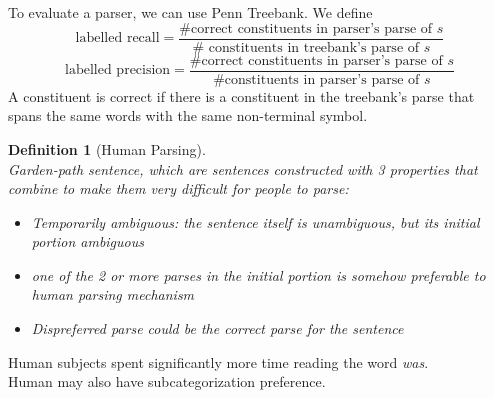 \documentclass[12pt]{article}
\newtheorem{definition}{Definition}[section]
\theoremstyle{definition}
\begin{document}
To evaluate a parser, we can use Penn Treebank. We define
\[
\text{labelled recall} = \frac{\# \text{correct constituents in parser's parse of }s}{\#\text{ constituents in treebank's parse of }s}
\]
\[
\text{labelled precision} = \frac{\#\text{correct constituents in parser's parse of }s}{\#\text{constituents in parser's parse of }s}
\]
A constituent is correct if there is a constituent in the treebank's parse that spans the same words with the same non-terminal symbol.\\
\begin{definition}[Human Parsing]
\hfill\\\normalfont Garden-path sentence, which are sentences constructed with 3 properties that combine to make them very difficult for people to parse:
\begin{itemize}
	\item Temporarily ambiguous: the sentence itself is unambiguous, but its initial portion ambiguous
	\item one of the 2 or more parses in the initial portion is somehow preferable to human parsing mechanism
	\item Dispreferred parse could be the correct parse for the sentence
\end{itemize}
\end{definition}
Human subjects spent significantly more time reading the word \textit{was}.\\
Human may also have subcategorization preference.
\clearpage
\end{document}
